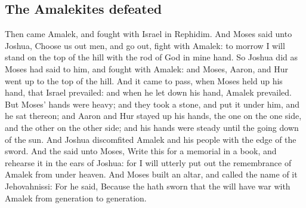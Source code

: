 \begin{biblechapter}
\section*{The Amalekites defeated}
\verse Then came Amalek, and fought with Israel in Rephidim.
\verse And Moses said unto Joshua, Choose us out men, and go out, fight with Amalek: to morrow I will stand on the top of the hill with the rod of God in mine hand.
\verse So Joshua did as Moses had said to him, and fought with Amalek: and Moses, Aaron, and Hur went up to the top of the hill.
\verse And it came to pass, when Moses held up his hand, that Israel prevailed: and when he let down his hand, Amalek prevailed.
\verse But Moses' hands were heavy; and they took a stone, and put it under him, and he sat thereon; and Aaron and Hur stayed up his hands, the one on the one side, and the other on the other side; and his hands were steady until the going down of the sun.
\verse And Joshua discomfited Amalek and his people with the edge of the sword.
\verse And the \LORD said unto Moses, Write this for a memorial in a book, and rehearse it in the ears of Joshua: for I will utterly put out the remembrance of Amalek from under heaven.
\verse And Moses built an altar, and called the name of it Jehovahnissi:
\verse For he said, Because the \LORD hath sworn that the \LORD will have war with Amalek from generation to generation.
\end{biblechapter}

